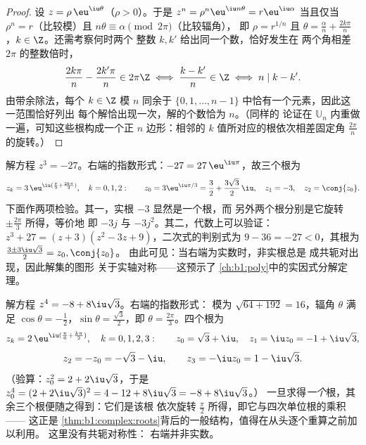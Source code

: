 \begin{proof}
设 $z = \rho\,\eu^{\iu\theta}$（$\rho > 0$）。于是 $z^n =
\rho^n \eu^{\iu n\theta} = r \eu^{\iu\alpha}$ 当且仅当 $\rho^n
= r$（比较模）且 $n\theta \equiv \alpha \pmod{2\pi}$（比较辐角），
即 $\rho = r^{1/n}$ 且 $\theta = \frac{\alpha}{n} +
\frac{2k\pi}{n}$，$k \in \Z$。还需考察何时两个
整数 $k, k'$ 给出同一个数，恰好发生在
两个角相差 $2\pi$ 的整数倍时，
\[
\frac{2k\pi}n - \frac{2k'\pi}n \in 2\pi\Z
\iff \frac{k - k'}n \in \Z
\iff n \mid k - k' .
\]
由带余除法，每个 $k \in \Z$ 模 $n$ 同余于
$\{0, 1, \dots, n-1\}$ 中恰有一个元素，因此这一范围恰好列出
每个解恰出现一次，解的个数恰为 $n$。（同样的
论证在 $\mathbb U_n$ 内重做一遍，可知这些根构成一个正
$n$ 边形：相邻的 $k$ 值所对应的根依次相差固定角
$\frac{2\pi}n$ 的旋转。）
\end{proof}

\begin{example}[$-27$ 的立方根]\label{ex:b1:complex:cuberoots}
解方程 $z^3 = -27$。右端的指数形式：$-27 =
27\,\eu^{\iu\pi}$，故三个根为
\[
z_k = 3\,\eu^{\iu(\frac\pi3 + \frac{2k\pi}3)}, \quad k = 0, 1, 2 :
\qquad
z_0 = 3\eu^{\iu\pi/3} = \frac32 + \frac{3\sqrt3}2\,\iu,
\quad
z_1 = -3,
\quad
z_2 = \conj{z_0} .
\]
下面作两项检验。其一，实根 $-3$ 显然是一个根，而
另外两个根分别是它旋转 $\pm\frac{2\pi}3$ 所得，等价地
即 $-3j$ 与 $-3j^2$。其二，代数上可以验证：$z^3 + 27 = (z +
3)(z^2 - 3z + 9)$，二次式的判别式为 $9 - 36 =
-27 < 0$，其根为 $\frac{3 \pm 3\iu\sqrt3}2 = z_0, \conj{z_0}$。
由此可见：当右端为实数时，非实根总是
成共轭对出现，因此解集的图形
关于实轴对称——这预示了
\cref{ch:b1:poly}中的实因式分解定理。
\end{example}

\begin{example}[右端为非实数的情形]\label{ex:b1:complex:fourthroots}
解方程 $z^4 = -8 + 8\iu\sqrt3$。右端的指数形式：
模为 $\sqrt{64 + 192} = 16$，辐角 $\theta$ 满足
$\cos\theta = -\frac12$，$\sin\theta = \frac{\sqrt3}2$，即
$\theta = \frac{2\pi}3$。四个根为
\[
z_k = 2\,\eu^{\iu(\frac\pi6 + \frac{k\pi}2)}, \quad k = 0, 1, 2,
3 :
\qquad
z_0 = \sqrt3 + \iu,\quad z_1 = \iu z_0 = -1 + \iu\sqrt3,
\]
\[
z_2 = -z_0 = -\sqrt3 - \iu,\qquad z_3 = -\iu z_0 = 1 - \iu\sqrt3 .
\]
（验算：$z_0^2 = 2 + 2\iu\sqrt3$，于是 $z_0^4 = (2 +
2\iu\sqrt3)^2 = 4 - 12 + 8\iu\sqrt3 = -8 + 8\iu\sqrt3$。）
一旦求得\emph{一个}根，其余三个根便随之得到：它们是该根
依次旋转 $\frac\pi2$ 所得，即它与四次单位根的乘积——
这正是
\cref{thm:b1:complex:roots}背后的一般结构，值得在从头逐个重算之前加以利用。
这里没有共轭对称性：
右端并非实数。
\end{example}

